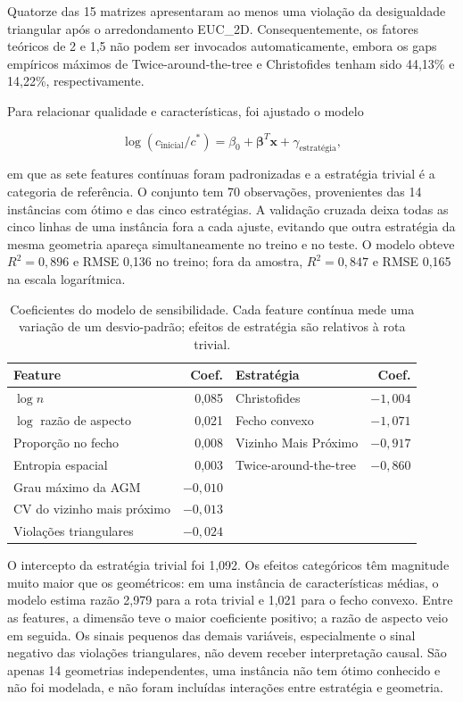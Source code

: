 \documentclass[12pt]{article}
\begin{document}
Quatorze das 15 matrizes apresentaram ao menos uma violação da desigualdade
triangular após o arredondamento EUC\_2D. Consequentemente, os fatores teóricos
de 2 e 1,5 não podem ser invocados automaticamente, embora os gaps empíricos
máximos de Twice-around-the-tree e Christofides tenham sido 44,13\% e 14,22\%,
respectivamente.

Para relacionar qualidade e características, foi ajustado o modelo

\[
\log(c_{\mathrm{inicial}}/c^*) = \beta_0 + \boldsymbol{\beta}^{T}\mathbf{x}
 + \gamma_{\text{estratégia}},
\]

em que as sete features contínuas foram padronizadas e a estratégia trivial é
a categoria de referência. O conjunto tem 70 observações, provenientes das 14
instâncias com ótimo e das cinco estratégias. A validação cruzada deixa todas
as cinco linhas de uma instância fora a cada ajuste, evitando que outra
estratégia da mesma geometria apareça simultaneamente no treino e no teste. O
modelo obteve $R^2=0,896$ e RMSE 0,136 no treino; fora da amostra, $R^2=0,847$
e RMSE 0,165 na escala logarítmica.

\begin{table}[H]
  \centering
  \caption{Coeficientes do modelo de sensibilidade. Cada feature contínua mede
  uma variação de um desvio-padrão; efeitos de estratégia são relativos à rota
  trivial.}
  \label{tab:sensitivity}
  \begin{tabular}{lrlr}
    \hline
    Feature & Coef. & Estratégia & Coef. \\
    \hline
    $\log n$                  &  0,085 & Christofides          & $-1,004$ \\
    $\log$ razão de aspecto   &  0,021 & Fecho convexo         & $-1,071$ \\
    Proporção no fecho        &  0,008 & Vizinho Mais Próximo  & $-0,917$ \\
    Entropia espacial         &  0,003 & Twice-around-the-tree & $-0,860$ \\
    Grau máximo da AGM        & $-0,010$ & & \\
    CV do vizinho mais próximo & $-0,013$ & & \\
    Violações triangulares    & $-0,024$ & & \\
    \hline
  \end{tabular}
\end{table}

O intercepto da estratégia trivial foi 1,092. Os efeitos categóricos têm
magnitude muito maior que os geométricos: em uma instância de características
médias, o modelo estima razão 2,979 para a rota trivial e 1,021 para o fecho
convexo. Entre as features, a dimensão teve o maior coeficiente positivo; a
razão de aspecto veio em seguida. Os sinais pequenos das demais variáveis,
especialmente o sinal negativo das violações triangulares, não devem receber
interpretação causal. São apenas 14 geometrias independentes, uma instância não
tem ótimo conhecido e não foi modelada, e não foram incluídas interações
entre estratégia e geometria.
\end{document}
